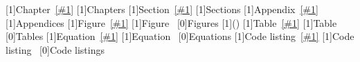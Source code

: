 \newrobustcmd  {\chapref}   [1]{Chapter~\ref{#1}}
\newrobustcmd  {\chaprefs}  [1]{Chapters\xspace}
\newrobustcmd  {\secref}   [1]{Section~\ref{#1}}
\newrobustcmd  {\secrefs}  [1]{Sections\xspace}
\newrobustcmd  {\appref}   [1]{Appendix~\ref{#1}}
\newrobustcmd  {\apprefs}  [1]{Appendices\xspace}
\newrobustcmd  {\figref}   [1]{Figure~\ref{#1}}
\newrobustcmd  {\subfigref}[1]{Figure~}
\newrobustcmd  {\figrefs}  [0]{Figures\xspace}
\newrobustcmd  {\subrefp}  [1]{()}
\newrobustcmd  {\tabref}   [1]{Table~\ref{#1}}
\newrobustcmd  {\subtabref}[1]{Table~}
\newrobustcmd  {\tabrefs}  [0]{Tables\xspace}
\robustify{\eqref}
\renewrobustcmd{\eqref}    [1]{Equation~\ref{#1}}
\newrobustcmd  {\subeqref} [1]{Equation~}
   [0]{Equations\xspace}
\newrobustcmd  {\lstref}   [1]{Code listing~\ref{#1}}
\newrobustcmd  {\sublstref}[1]{Code listing~}
\newrobustcmd  {\lstrefs}  [0]{Code listings\xspace}


\newlength{\initiallinewidth} %
\newlength{\screenshotwidth}
\newlength{\screenshotunitlength}
\newlength{\imageunitlength}




